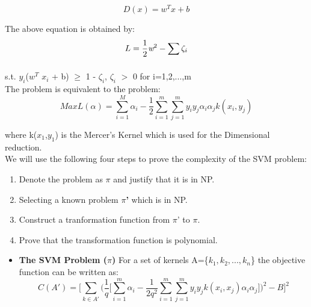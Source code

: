 \documentclass[12pt,a4paper,final]{report}
\begin{document}
{{{{\begin{equation}
D(x)=w^Tx+b
\end{equation}

The above equation is obtained by:
\begin{equation}
L=\frac{1}{2} \emph{w}^2 - \sum_{}^{} \zeta_i
\end{equation}

s.t. $y_i$($w^T$ $x_i$ + b) $\geq$ 1 - $\zeta_i$, $\zeta_i$ $>$ 0 for i=1,2,...,m \\
\newline The problem is equivalent to the problem:\\
\begin{equation}
Max L(\alpha)= \sum_{i=1}^{M} \alpha_i - \frac{1}{2} \sum_{i=1}^{m}\sum_{j=1}^{m} y_iy_j\alpha_i\alpha_jk(x_i,y_j)
\end{equation}

where k($x_1$,$y_1$) is the Mercer's Kernel which is used for the 
Dimensional reduction.\\
\newline We will use the following four steps to prove the complexity of the SVM problem:
\begin{enumerate}
\item
Denote the problem as \textbf{$\pi$} and justify that it is in NP.
\item
Selecting a known problem \textbf{$\pi$'} which is in NP.
\item
Construct a tranformation function from $\pi$' to $\pi$.
\item
Prove that the transformation function is polynomial.
\end{enumerate}
\begin{itemize}
\newpage
\item
\textbf{The SVM Problem ($\pi$)}
\newline For a set of kernels A=\{$k_1,k_2,...,k_n$\} the objective function can be written as:\\

\begin{equation}
C(A')=	\Big[\sum_{k \in A'}^{}\Big(\frac{1}{q}\Big[\sum_{i=1}^{m} \alpha_i - \frac{1}{2q^2} \sum_{i=1}^{m}\sum_{j=1}^{m}y_iy_jk(x_i,x_j)\alpha_i\alpha_j\Big]\Big)^2- B\Big]^2
\end{equation}	
\newline 


\end{itemize}}}}}
\end{document}
